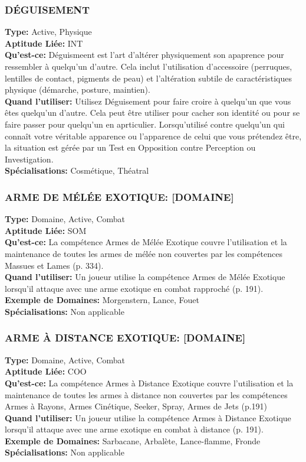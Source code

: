 \subsubsection{DÉGUISEMENT} \textbf{Type:} Active, Physique \\ \textbf{Aptitude Liée:} INT \\ \textbf{Qu'est-ce:} Déguismeent est l'art d'altérer physiquement son apaprence pour ressembler à quelqu'un d'autre. Cela inclut l'utilisation d'accessoire (perruques, lentilles de contact, pigments de peau) et l'altération subtile de caractéristiques physique (démarche, posture, maintien). \\ \textbf{Quand l'utiliser:} Utilisez Déguisement pour faire croire à quelqu'un que vous êtes quelqu'un d'autre. Cela peut être utiliser pour cacher son identité ou pour se faire passer pour quelqu'un en aprticulier. Lorsqu'utilisé contre quelqu'un qui connaît votre véritable apparence ou l'apparence de celui que vous prétendez être, la situation est gérée par un Test en Opposition contre Perception ou Investigation. \\ \textbf{Spécialisations:} Cosmétique, Théatral 

\subsubsection{ARME DE MÉLÉE EXOTIQUE: [DOMAINE]} \textbf{Type:} Domaine, Active, Combat \\ \textbf{Aptitude Liée:} SOM \\ \textbf{Qu'est-ce:} La compétence Armes de Mélée Exotique couvre l'utilisation et la maintenance de toutes les armes de mélée non couvertes par les compétences Massues et Lames (p. 334). \\ \textbf{Quand l'utiliser:} Un joueur utilise la compétence Armes de Mélée Exotique lorsqu'il attaque avec une arme exotique en combat rapproché (p. 191). \\ \textbf{Exemple de Domaines:} Morgenstern, Lance, Fouet \\ \textbf{Spécialisations:} Non applicable 

\subsubsection{ARME À DISTANCE EXOTIQUE: [DOMAINE]} 
\textbf{Type:} Domaine, Active, Combat \\
\textbf{Aptitude Liée:} COO \\
\textbf{Qu'est-ce:} La compétence Armes à Distance Exotique couvre l'utilisation et la maintenance de toutes les armes à distance non couvertes par les compétences Armes à Rayons, Armes Cinétique, Seeker, Spray, Armes de Jets (p.191) \\
\textbf{Quand l'utiliser:} Un joueur utilise la compétence Armes à Distance Exotique lorsqu'il attaque avec une arme exotique en combat à distance (p. 191). \\
\textbf{Exemple de Domaines:} Sarbacane, Arbalète, Lance-flamme, Fronde \\
\textbf{Spécialisations:} Non applicable 

